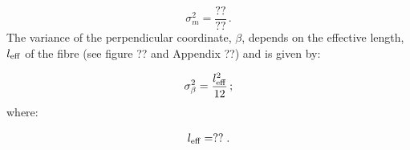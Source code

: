 \begin{equation}
  \sigma^2_m = \frac{??}{??} \, .
\end{equation}
The variance of the perpendicular coordinate, $\beta$, depends on the effective length, $l_{\rm eff}$ of the fibre (see figure ?? and Appendix ??) and is given by:

\begin{equation}
  \sigma^2_\beta = \frac{l^2_{\rm eff}}{12} \, ;
\end{equation}
where:

\begin{equation}
  l_{\rm eff} = ?? \; .
\end{equation}
